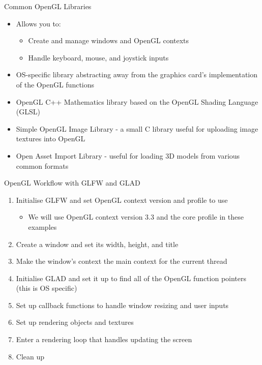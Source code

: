 \documentclass{beamer}
\begin{document}
\begin{frame}{Common OpenGL Libraries}
    \begin{itemize}
        \item[GLFW~\footnote{GLFW: \url{www.glfw.org}}:] Allows you to:
        \begin{itemize}
            \item Create and manage windows and OpenGL contexts
            \item Handle keyboard, mouse, and joystick inputs
        \end{itemize}
        \item[GLAD~\footnote{GLAD: \url{glad.dav1d.de}}:] OS-specific library abstracting away from the graphics card's
            implementation of the OpenGL functions
        \item[GLM~\footnote{OpenGL Mathematics: \url{glm.g-truc.net/0.9.9/index.html}}:] OpenGL C++ Mathematics library
            based on the OpenGL Shading Language (GLSL)
        \item[SOIL~\footnote{Simple OpenGL Image Library: \url{www.lonesock.net/soil.html}}:] Simple OpenGL Image
            Library - a small C library useful for uploading image textures into OpenGL
        \item[ASSIMP~\footnote{The Open-Asset-Importer-Lib: \url{www.assimp.org}}:] Open Asset Import Library - useful
            for loading 3D models from various common formats
    \end{itemize}
\end{frame}

\begin{frame}[fragile]{OpenGL Workflow with GLFW and GLAD}
    \begin{enumerate}
        \item Initialise GLFW and set OpenGL context version and profile to use
        \begin{itemize}
            \item We will use OpenGL context version 3.3 and the core profile in these examples
        \end{itemize}
        \item Create a window and set its width, height, and title
        \item Make the window's context the main context for the current thread
        \item Initialise GLAD and set it up to find all of the OpenGL function pointers (this is OS specific)
        \item Set up callback functions to handle window resizing and user inputs
        \item Set up rendering objects and textures
        \item Enter a rendering loop that handles updating the screen
        \item Clean up
    \end{enumerate}
\end{frame}
\end{document}
